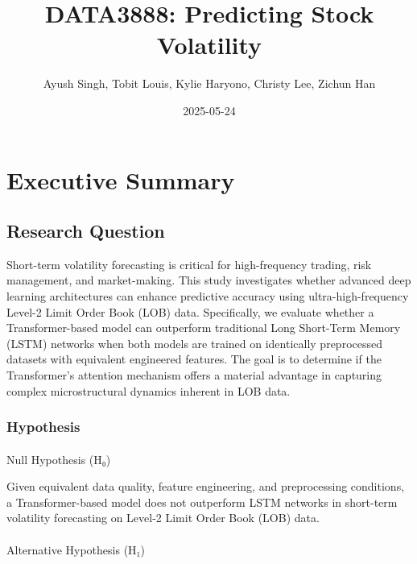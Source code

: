 \documentclass[
  letterpaper,
  DIV=11,
  numbers=noendperiod]{scrartcl}
\title{DATA3888: Predicting Stock Volatility}
\author{Ayush Singh, Tobit Louis, Kylie Haryono, Christy Lee, Zichun
Han}
\date{2025-05-24}
\makeatletter
\let\oldparagraph\paragraph
\renewcommand{\paragraph}{
    \@ifstar
      \xxxParagraphStar
      \xxxParagraphNoStar
  }
\newcommand{\xxxParagraphStar}[1]{\oldparagraph*{#1}\mbox{}}
\newcommand{\xxxParagraphNoStar}[1]{\oldparagraph{#1}\mbox{}}
\renewcommand*\contentsname{Table of contents}
\newcommand\contentsname{Table of contents}
\makeatother
\begin{document}
\maketitle

\renewcommand*\contentsname{Table of contents}
{
\hypersetup{linkcolor=}
\setcounter{tocdepth}{3}
\tableofcontents
}

\section{Executive Summary}\label{executive-summary}

\subsection{Research Question}\label{research-question}

Short-term volatility forecasting is critical for high-frequency
trading, risk management, and market-making. This study investigates
whether advanced deep learning architectures can enhance predictive
accuracy using ultra-high-frequency Level-2 Limit Order Book (LOB) data.
Specifically, we evaluate whether a Transformer-based model can
outperform traditional Long Short-Term Memory (LSTM) networks when both
models are trained on identically preprocessed datasets with equivalent
engineered features. The goal is to determine if the Transformer's
attention mechanism offers a material advantage in capturing complex
microstructural dynamics inherent in LOB data.

\subsubsection{Hypothesis}\label{hypothesis}

\paragraph{Null Hypothesis (H₀)}\label{null-hypothesis-hux2080}

Given equivalent data quality, feature engineering, and preprocessing
conditions, a Transformer-based model does not outperform LSTM networks
in short-term volatility forecasting on Level-2 Limit Order Book (LOB)
data.

\paragraph{Alternative Hypothesis
(H₁)}\label{alternative-hypothesis-hux2081}
\end{document}
